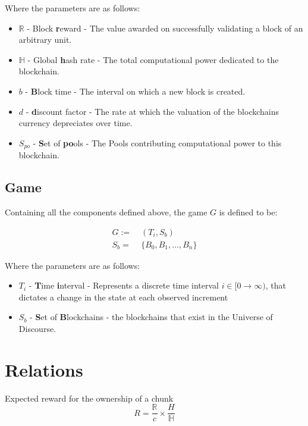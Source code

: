 \noindent Where the parameters are as follows:
\begin{itemize}
    \item $\mathbb{R}$ - Block \textbf{r}eward - The value awarded on successfully validating a block of an arbitrary unit.
    \item $\mathbb{H}$ - Global \textbf{h}ash rate - The total computational power dedicated to the blockchain.
    \item $b$ - \textbf{B}lock time - The interval on which a new block is created.
    \item $d$ - \textbf{d}iscount factor - The rate at which the valuation of the blockchains currency depreciates over time.
    \item $S_{po}$ - \textbf{S}et of \textbf{po}ols - The Pools contributing computational power to this blockchain.
\end{itemize}

\subsection{Game}

Containing all the components defined above, the game $G$ is defined to be:

\begin{align}
    G :=&\; (T_i, S_b) \\
    S_b =&\; \{B_0, B_1, \ldots, B_n\}
\end{align}

\noindent Where the parameters are as follows:
\begin{itemize}
    \item $T_i$ - \textbf{T}ime \textbf{i}nterval - Represents a discrete time interval $i \in [0 \rightarrow \infty)$, that dictates a change in the state at each observed increment
    \item $S_b$ - \textbf{S}et of \textbf{B}lockchains - the blockchains that exist in the Universe of Discourse.
\end{itemize}

\section{Relations}

\noindent Expected reward for the ownership of a chunk
\begin{equation} \label{equation:chunkreward}
    R = \frac{\mathbb{R}}{c} \times \frac{H}{\mathbb{H}}
\end{equation}

